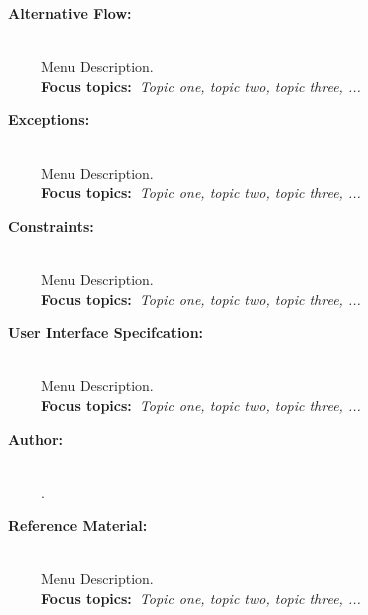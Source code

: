 \begin{description}
      \item[~\bfseries Alternative Flow:] \hfill \\%
            Menu Description.~\\%
            {\textbf{Focus topics:~}\emph{Topic one, topic two, topic three, ...}}%
      \item[~\bfseries Exceptions:] \hfill \\%
            Menu Description.~\\%
            {\textbf{Focus topics:~}\emph{Topic one, topic two, topic three, ...}}%
      \item[~\bfseries Constraints:] \hfill \\%
            Menu Description.~\\%
            {\textbf{Focus topics:~}\emph{Topic one, topic two, topic three, ...}}%
      \item[~\bfseries User Interface Specifcation:] \hfill \\%
            Menu Description.~\\%
            {\textbf{Focus topics:~}\emph{Topic one, topic two, topic three, ...}}%
      \item[~\bfseries Author:] \hfill \\%
            \reportAuthor{}.~\\%
      \item[~\bfseries Reference Material:] \hfill \\%
            Menu Description.~\\%
            {\textbf{Focus topics:~}\emph{Topic one, topic two, topic three, ...}}%

\end{description}


